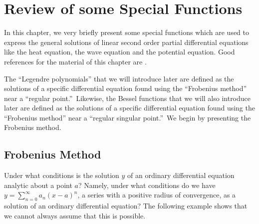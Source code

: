 \chapter{Review of some Special Functions}\label{ChapSpecFunct}

In this chapter, we very briefly present some special functions which
are used to express the general solutions of linear second order
partial differential equations like the heat equation, the wave
equation and the potential equation.  Good references for the
material of this chapter are \cite{Simm,RenRog}.

The ``Legendre polynomials'' that we will introduce later are defined
as the solutions of a specific differential equation found using the
``Frobenius method'' near a ``regular point.''\ Likewise,
the Bessel functions that we will also introduce later are defined
as the solutions of a specific differential equation found using the
``Frobenius method'' near a ``regular singular point.''\
We begin by presenting the Frobenius method.

\section{Frobenius Method}

Under what conditions is the solution $y$ of an ordinary differential
equation analytic about a point $a$?  Namely, under what conditions do
we have $\displaystyle y = \sum_{n=0}^\infty  a_n (x-a)^n$, a series
with a positive radius of convergence, as a solution of an ordinary
differential equation?  The following example shows that we cannot
always assume that this is possible.

